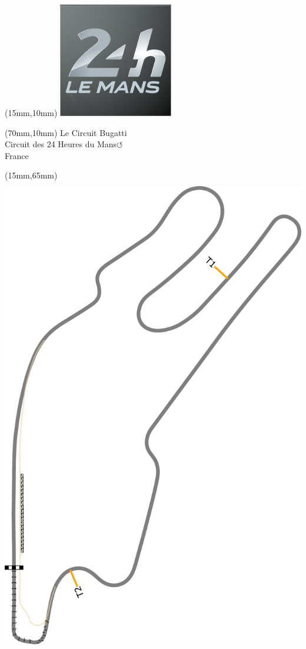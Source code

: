 \null\newpage
\begin{textblock*}{50mm}(15mm,10mm)%
\includegraphics[width=50mm]{LG/2015-05-20_00084.png}
\end{textblock*}
\begin{textblock*}{130mm}(70mm,10mm)%
{\fontsize{20}{20}\selectfont Le Circuit Bugatti\\}
{\fontsize{16}{16}\selectfont Circuit des 24 Heures du Mans\hfill \huge$\circlearrowleft$\\}
{\fontsize{12}{12}\selectfont France\\}
\end{textblock*}
\begin{textblock*}{185mm}(15mm,65mm)%
\centering
\mbox{\includegraphics[width=185mm,height=210mm,keepaspectratio]{PT/LECIBU.pdf}}
\end{textblock*}
